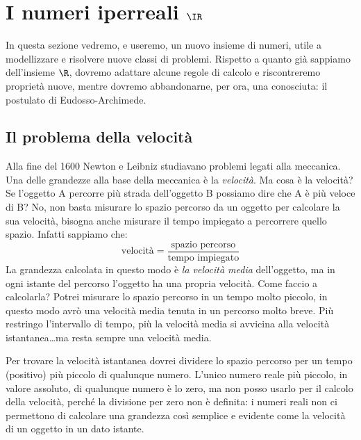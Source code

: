 
\section{I numeri iperreali $\IR$}
\label{sec:insnum_iperreali}

In questa sezione vedremo, e useremo, un nuovo insieme di numeri, utile a 
modellizzare e risolvere nuove classi di problemi. 
Rispetto a quanto già sappiamo dell'insieme \(\R\), dovremo adattare alcune 
regole di calcolo e riscontreremo proprietà nuove, mentre dovremo 
abbandonarne, per ora, una conosciuta: il postulato di Eudosso-Archimede. 

\subsection{Il problema della velocità}
\label{subsec:insnum_velocita}

Alla fine del 1600 Newton e Leibniz studiavano problemi legati alla 
meccanica. 
Una delle grandezze alla base della meccanica è la \emph{velocità}. 
Ma cosa è la velocità? 
Se l'oggetto A percorre più strada dell'oggetto B possiamo dire 
che A è più veloce di B? No, non basta misurare lo spazio percorso da un 
oggetto per calcolare la sua velocità, bisogna anche misurare il tempo 
impiegato a percorrere quello spazio. Infatti sappiamo che:
\[\text{velocità} = 
  \frac{\text{spazio percorso}}{\text{tempo impiegato}}\]
La grandezza calcolata in questo modo è \emph{la velocità media} 
dell'oggetto, ma in ogni istante del percorso l'oggetto ha una propria 
velocità. 
Come faccio a calcolarla? Potrei misurare lo spazio percorso in un tempo 
molto piccolo, in questo modo avrò una velocità media tenuta in un percorso 
molto breve. 
Più restringo l'intervallo di tempo, più la velocità media si avvicina alla 
velocità istantanea\dots ma resta sempre una velocità media. 

Per trovare la velocità istantanea dovrei dividere lo spazio percorso per 
un tempo (positivo) più piccolo di qualunque numero. L'unico numero reale
più piccolo, in valore assoluto, di qualunque numero è lo zero, ma 
non posso usarlo per il calcolo della velocità, perché la divisione per 
zero non è definita: i numeri reali non ci permettono di calcolare una 
grandezza così semplice e evidente come la velocità di un oggetto in un 
dato istante.

